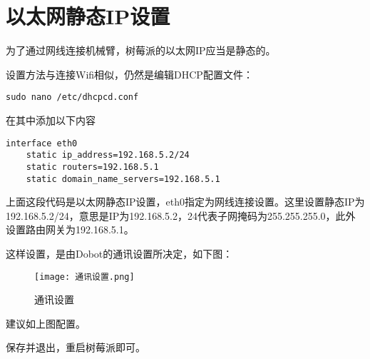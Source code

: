 \section{以太网静态IP设置}
为了通过网线连接机械臂，树莓派的以太网IP应当是静态的。
\par
设置方法与连接Wifi相似，仍然是编辑DHCP配置文件：
\begin{lstlisting}[style=bashstyle]
	sudo nano /etc/dhcpcd.conf
\end{lstlisting}
在其中添加以下内容
\begin{lstlisting}[style=configstyle]
	interface eth0
	static ip_address=192.168.5.2/24
	static routers=192.168.5.1
	static domain_name_servers=192.168.5.1
\end{lstlisting}
\par
上面这段代码是以太网静态IP设置，eth0指定为网线连接设置。这里设置静态IP为192.168.5.2/24，意思是IP为192.168.5.2，24代表子网掩码为255.255.255.0，此外设置路由网关为192.168.5.1。
\par
这样设置，是由Dobot的通讯设置所决定，如下图：
\begin{figure}[H]
	\centering
	\texttt{[image: 通讯设置.png]}
	\caption{通讯设置}
	\label{fig:example}
\end{figure}
建议如上图配置。
\par
保存并退出，重启树莓派即可。

